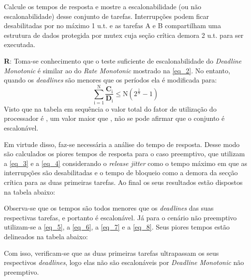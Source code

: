 \documentclass[
	10pt,				%
	openright,			%
	oneside,			%
	a4paper,			%
	english,			%
	french,				%
	spanish,			%
	brazil,				%
	]{abntex2}
\newcommand{\ª}{%
\textordfeminine
}
\begin{document}
\begin{enumerate}
\begin{center}
\end{center}

Calcule os tempos de resposta e mostre a escalonabilidade (ou não escalonabilidade) desse conjunto
de tarefas. Interrupções podem ficar desabilitadas por no máximo 1 u.t. e as tarefas A e B compartilham
 uma estrutura de dados protegida por mutex cuja seção crítica demora 2 u.t. para ser executada.

\textbf{R}: Toma-se conhecimento que o teste suficiente de escalonabilidade do \textit{Deadline Monotonic} é similar ao do \textit{Rate Monotonic} mostrado na \autoref{eq_2}. 
No entanto, quando os \textit{deadlines} são menores que os períodos ela é modificada para:
\begin{equation} \label{eq_10}
	\sum_{\mathrm{i} = 1}^{\mathrm{N}}{\frac{\mathbf{C}_{\mathrm{i}}}{\mathbf{D}_{\mathrm{i}}}} \le \mathrm{N} \left( 2^{\frac{1}{\mathrm{N}}} - 1 \right)
\end{equation}
Visto que na tabela em sequência o valor total do fator de utilização do processador é , um valor maior que 
, não se pode afirmar que o conjunto é escalonável.

Em virtude disso, faz-se necessária a análise do tempo de resposta. Desse modo são calculados os piores tempos de resposta para o caso preemptivo, 
que utilizam a \autoref{eq_3} e a \autoref{eq_4} considerando o \textit{release jitter} como o tempo máximo em que as interrupções são desabilitadas e 
o tempo de bloqueio como a demora da secção crítica para as duas primeiras tarefas. Ao final os seus resultados estão dispostos na tabela abaixo:
\begin{center}
\end{center}
Observa-se que os tempos são todos menores que os \textit{deadlines} das suas respectivas tarefas, e portanto é escalonável. Já para o cenário não preemptivo 
utilizam-se a \autoref{eq_5}, a \autoref{eq_6}, a \autoref{eq_7} e a \autoref{eq_8}. Seus piores tempos estão delineados na tabela abaixo:
\begin{center}
\end{center}
Com isso, verificam-se que as duas primeiras tarefas ultrapassam os seus respectivos \textit{deadlines}, logo elas não são escalonáveis por \textit{Deadline Monotonic} não preemptivo.


\end{enumerate}
\end{document}

